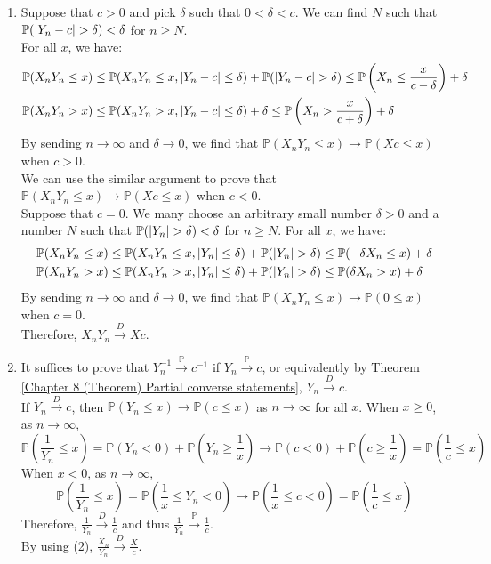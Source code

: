 \documentclass{huhtakm-template-book}
\newcommand{\prob}{\mathbb{P}}
\begin{document}
\begin{proofing}
\begin{enumerate}
		\item Suppose that $c>0$ and pick $\delta$ such that $0<\delta<c$. We can find $N$ such that $\prob(\abs{Y_{n}-c}>\delta)<\delta$ for $n\geq N$.\\
		For all $x$, we have:
		\begin{align*}
			\prob(X_{n}Y_{n}\leq x)&\leq\prob(X_{n}Y_{n}\leq x,\abs{Y_{n}-c}\leq\delta)+\prob(\abs{Y_{n}-c}>\delta)\leq\prob\left(X_{n}\leq \frac{x}{c-\delta}\right)+\delta\\
			\prob(X_{n}Y_{n}>x)&\leq\prob(X_{n}Y_{n}>x,\abs{Y_{n}-c}\leq\delta)+\delta\leq\prob\left(X_{n}>\frac{x}{c+\delta}\right)+\delta
		\end{align*}
		By sending $n\to\infty$ and $\delta\to 0$, we find that $\prob(X_{n}Y_{n}\leq x)\to\prob(Xc\leq x)$ when $c>0$.\\
		We can use the similar argument to prove that $\prob(X_{n}Y_{n}\leq x)\to\prob(Xc\leq x)$ when $c<0$.\\
		Suppose that $c=0$. We many choose an arbitrary small number $\delta>0$ and a number $N$ such that $\prob(\abs{Y_{n}}>\delta)<\delta$ for $n\geq N$. For all $x$, we have:
		\begin{align*}
			\prob(X_{n}Y_{n}\leq x)&\leq\prob(X_{n}Y_{n}\leq x,\abs{Y_{n}}\leq\delta)+\prob(\abs{Y_{n}}>\delta)\leq\prob(-\delta X_{n}\leq x)+\delta\\
			\prob(X_{n}Y_{n}> x)&\leq\prob(X_{n}Y_{n}>x,\abs{Y_{n}}\leq\delta)+\prob(\abs{Y_{n}}>\delta)\leq\prob(\delta X_{n}>x)+\delta
		\end{align*}
		By sending $n\to\infty$ and $\delta\to 0$, we find that $\prob(X_{n}Y_{n}\leq x)\to\prob(0\leq x)$ when $c=0$.\\
		Therefore, $X_{n}Y_{n}\xrightarrow{D}Xc$.
		\item It suffices to prove that $Y_{n}^{-1}\xrightarrow{\prob}c^{-1}$ if $Y_{n}\xrightarrow{\prob}c$, or equivalently by Theorem \ref{Chapter 8 (Theorem) Partial converse statements}, $Y_{n}\xrightarrow{D}c$.\\
		If $Y_{n}\xrightarrow{D}c$, then $\prob(Y_{n}\leq x)\to\prob(c\leq x)$ as $n\to\infty$ for all $x$. When $x\geq 0$, as $n\to\infty$,
		\begin{equation*}
			\prob\left(\frac{1}{Y_{n}}\leq x\right)=\prob(Y_{n}<0)+\prob\left(Y_{n}\geq\frac{1}{x}\right)\to\prob(c<0)+\prob\left(c\geq\frac{1}{x}\right)=\prob\left(\frac{1}{c}\leq x\right)
		\end{equation*}
		When $x<0$, as $n\to\infty$,
		\begin{equation*}
			\prob\left(\frac{1}{Y_{n}}\leq x\right)=\prob\left(\frac{1}{x}\leq Y_{n}<0\right)\to\prob\left(\frac{1}{x}\leq c<0\right)=\prob\left(\frac{1}{c}\leq x\right)
		\end{equation*}
		Therefore, $\frac{1}{Y_{n}}\xrightarrow{D}\frac{1}{c}$ and thus $\frac{1}{Y_{n}}\xrightarrow{\prob}\frac{1}{c}$.\\
		By using (2), $\frac{X_{n}}{Y_{n}}\xrightarrow{D}\frac{X}{c}$. \end{enumerate}
\end{proofing}
\end{document}
